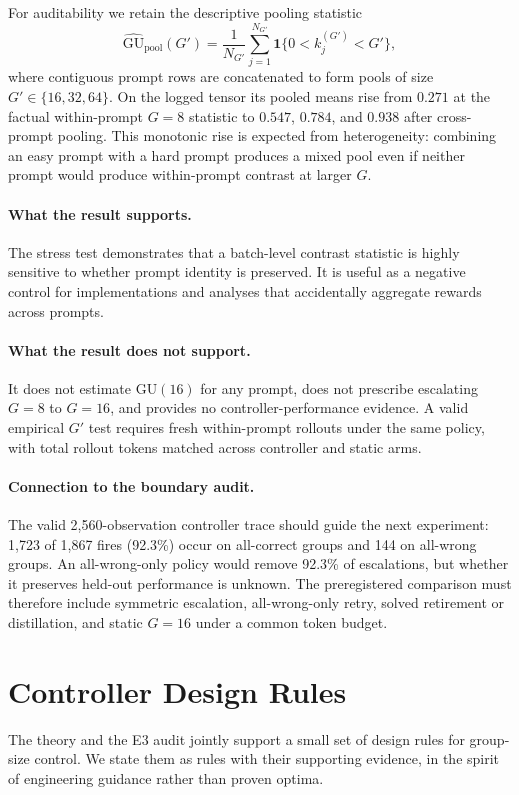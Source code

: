 \documentclass{article}
\begin{document}
For auditability we retain the descriptive pooling statistic
\[
\widehat{\mathrm{GU}}_{\mathrm{pool}}(G')=
\frac{1}{N_{G'}}\sum_{j=1}^{N_{G'}}
\mathbf{1}\{0<k_j^{(G')}<G'\},
\]
where contiguous prompt rows are concatenated to form pools of size
$G'\in\{16,32,64\}$. On the logged tensor its pooled means rise from $0.271$
at the factual within-prompt $G=8$ statistic to $0.547$, $0.784$, and $0.938$
after cross-prompt pooling. This monotonic rise is expected from heterogeneity:
combining an easy prompt with a hard prompt produces a mixed pool even if neither
prompt would produce within-prompt contrast at larger $G$.

\paragraph{What the result supports.}
The stress test demonstrates that a batch-level contrast statistic is highly
sensitive to whether prompt identity is preserved. It is useful as a negative
control for implementations and analyses that accidentally aggregate rewards
across prompts.

\paragraph{What the result does not support.}
It does not estimate $\mathrm{GU}(16)$ for any prompt, does not prescribe
escalating $G=8$ to $G=16$, and provides no controller-performance evidence.
A valid empirical $G'$ test requires fresh within-prompt rollouts under the same
policy, with total rollout tokens matched across controller and static arms.

\paragraph{Connection to the boundary audit.}
The valid 2,560-observation controller trace should guide the next experiment:
1,723 of 1,867 fires (92.3\%) occur on all-correct groups and 144 on all-wrong
groups. An all-wrong-only policy would remove 92.3\% of escalations, but whether
it preserves held-out performance is unknown. The preregistered comparison must
therefore include symmetric escalation, all-wrong-only retry, solved retirement
or distillation, and static $G=16$ under a common token budget.
 \section{Controller Design Rules}
\label{sec:p7-rules}
The theory and the E3 audit jointly support a small set of design rules for
group-size control. We state them as rules with their supporting evidence,
in the spirit of engineering guidance rather than proven optima.
\end{document}
